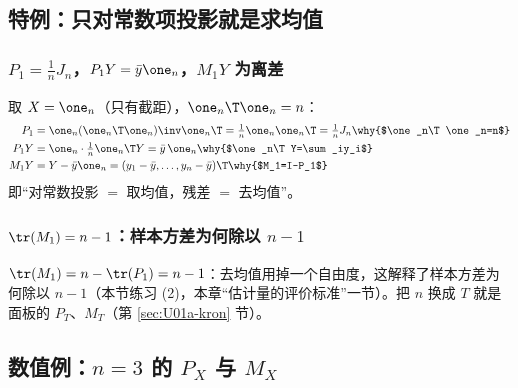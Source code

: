 \subsection{特例：只对常数项投影就是求均值}

\subsubsection{\texorpdfstring{$P_1=\frac1nJ_n$}{P\_1 = J/n}，\texorpdfstring{$P_1Y=\bar y\one_n$}{P\_1 Y = y-bar 1}，\texorpdfstring{$M_1Y$}{M\_1 Y} 为离差}

取 $X=\one_n$（只有截距），$\one_n\T\one_n=n$：
\begin{align*}
P_1 &= \one_n(\one_n\T\one_n)\inv\one_n\T=\tfrac1n\one_n\one_n\T=\tfrac1nJ_n \why{$\one_n\T\one_n=n$}\\
P_1Y &= \one_n\cdot\tfrac1n\one_n\T Y=\bar y\,\one_n \why{$\one_n\T Y=\sum_iy_i$}\\
M_1Y &= Y-\bar y\one_n=(y_1-\bar y,\dots,y_n-\bar y)\T \why{$M_1=I-P_1$}
\end{align*}
即“对常数投影 $=$ 取均值，残差 $=$ 去均值”。

\subsubsection{\texorpdfstring{$\tr(M_1)=n-1$}{tr(M\_1) = n-1}：样本方差为何除以 \texorpdfstring{$n-1$}{n-1}}

$\tr(M_1)=n-\tr(P_1)=n-1$：去均值用掉一个自由度，这解释了样本方差为何除以 $n-1$（本节练习 (2)，本章“估计量的评价标准”一节）。把 $n$ 换成 $T$ 就是面板的 $P_T$、$M_T$（第 \ref{sec:U01a-kron} 节）。

\subsection{数值例：\texorpdfstring{$n=3$}{n=3} 的 \texorpdfstring{$P_X$}{P} 与 \texorpdfstring{$M_X$}{M}}

